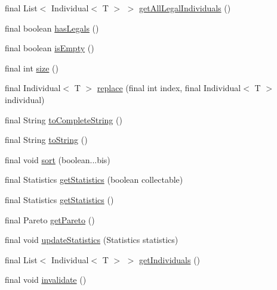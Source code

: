\begin{DoxyCompactItemize}
\item 
final List$<$ Individual$<$ T $>$ $>$ \hyperlink{classjenes_1_1population_1_1_population_3_01_t_01extends_01_chromosome_01_4_aa357ca41f277c735baf2a0cf3775aedb}{get\-All\-Legal\-Individuals} ()
\item 
final boolean \hyperlink{classjenes_1_1population_1_1_population_3_01_t_01extends_01_chromosome_01_4_a04a6d88ec93e1f09ac1a2a2accd041f3}{has\-Legals} ()
\item 
final boolean \hyperlink{classjenes_1_1population_1_1_population_3_01_t_01extends_01_chromosome_01_4_a6d6d8f4620ce1317c58d97e3537b60a6}{is\-Empty} ()
\item 
final int \hyperlink{classjenes_1_1population_1_1_population_3_01_t_01extends_01_chromosome_01_4_adb9f8282e00932d31fddaa4218c5712e}{size} ()
\item 
final Individual$<$ T $>$ \hyperlink{classjenes_1_1population_1_1_population_3_01_t_01extends_01_chromosome_01_4_ab7f90d1593df2b3166f9489910a133a1}{replace} (final int index, final Individual$<$ T $>$ individual)
\item 
final String \hyperlink{classjenes_1_1population_1_1_population_3_01_t_01extends_01_chromosome_01_4_afd83f18e21084400918c28b9712593eb}{to\-Complete\-String} ()
\item 
final String \hyperlink{classjenes_1_1population_1_1_population_3_01_t_01extends_01_chromosome_01_4_afe4f1ec3a9ebb895c7a6077285cf1868}{to\-String} ()
\item 
final void \hyperlink{classjenes_1_1population_1_1_population_3_01_t_01extends_01_chromosome_01_4_a0996839c203b0edd26445542cb1624d7}{sort} (boolean...\-bis)
\item 
final Statistics \hyperlink{classjenes_1_1population_1_1_population_3_01_t_01extends_01_chromosome_01_4_abedc5b29d8fe8d17dcd233c290df7dce}{get\-Statistics} (boolean collectable)
\item 
final Statistics \hyperlink{classjenes_1_1population_1_1_population_3_01_t_01extends_01_chromosome_01_4_a5ac2e746b619d828955f36df17b96449}{get\-Statistics} ()
\item 
final Pareto \hyperlink{classjenes_1_1population_1_1_population_3_01_t_01extends_01_chromosome_01_4_a608df5ac997f7f803841c1ca8c63b4f6}{get\-Pareto} ()
\item 
final void \hyperlink{classjenes_1_1population_1_1_population_3_01_t_01extends_01_chromosome_01_4_a2c25dfd7e794dda3bd77926a1bebc099}{update\-Statistics} (Statistics statistics)
\item 
final List$<$ Individual$<$ T $>$ $>$ \hyperlink{classjenes_1_1population_1_1_population_3_01_t_01extends_01_chromosome_01_4_a2b35c7d7dfa8e6463339505c56742ada}{get\-Individuals} ()
\item 
final void \hyperlink{classjenes_1_1population_1_1_population_3_01_t_01extends_01_chromosome_01_4_aea1e2d97d600c0f895ae347cdcd8f2b0}{invalidate} ()
\end{DoxyCompactItemize}
